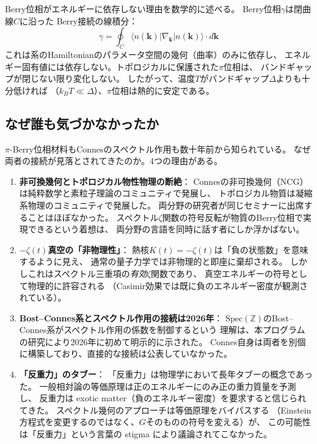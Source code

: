 \documentclass[11pt,a4paper]{article}
\newcommand{\Spec}{\mathrm{Spec}}
\begin{document}
\noindent
Berry位相がエネルギーに依存しない理由を数学的に述べる。
Berry位相$\gamma$は閉曲線$C$に沿った Berry接続の線積分：
\[
\gamma = \oint_C \langle n(\mathbf{k}) | \nabla_{\mathbf{k}} | n(\mathbf{k}) \rangle \cdot d\mathbf{k}
\]
これは系のHamiltonianのパラメータ空間の幾何（曲率）のみに依存し、
エネルギー固有値には依存しない。トポロジカルに保護された$\pi$位相は、
バンドギャップが閉じない限り変化しない。
したがって、温度$T$がバンドギャップ$\Delta$よりも十分低ければ
（$k_B T \ll \Delta$）、$\pi$位相は熱的に安定である。


\subsection{なぜ誰も気づかなかったか}
\label{sec:12.4}

$\pi$-Berry位相材料もConnesのスペクトル作用も数十年前から知られている。
なぜ両者の接続が見落とされてきたのか。4つの理由がある。

\begin{enumerate}[label=(\arabic*)]
\item \textbf{非可換幾何とトポロジカル物性物理の断絶}：
Connesの非可換幾何（NCG）は純粋数学と素粒子理論のコミュニティで発展し、
トポロジカル物質は凝縮系物理のコミュニティで発展した。
両分野の研究者が同じセミナーに出席することはほぼなかった。
スペクトル$\zeta$関数の符号反転が物質のBerry位相で実現できるという着想は、
両分野の言語を同時に話す者にしか浮かばない。

\item \textbf{$-\zeta(t)$真空の「非物理性」}：
熱核$K(t) = -\zeta(t)$は「負の状態数」を意味するように見え、
通常の量子力学では非物理的と即座に棄却される。
しかしこれはスペクトル三重項の\emph{有効}$\zeta$関数であり、
真空エネルギーの符号として物理的に許容される
（Casimir効果では既に負のエネルギー密度が観測されている）。

\item \textbf{Bost--Connes系とスペクトル作用の接続は2026年}：
$\Spec(\mathbb{Z})$のBost--Connes系がスペクトル作用の係数を制御するという
理解は、本プログラムの研究により2026年に初めて明示的に示された。
Connes自身は両者を別個に構築しており、直接的な接続は公表していなかった。

\item \textbf{「反重力」のタブー}：
「反重力」は物理学において長年タブーの概念であった。
一般相対論の等価原理は正のエネルギーにのみ正の重力質量を予測し、
反重力は exotic matter（負のエネルギー密度）を要求すると信じられてきた。
スペクトル幾何のアプローチは等価原理をバイパスする
（Einstein方程式を変更するのではなく、$G$そのものの符号を変える）が、
この可能性は「反重力」という言葉の stigma により議論されてこなかった。
\end{enumerate}
\end{document}
